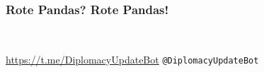 \documentclass{beamer}
\begin{document}
\begin{frame}[fragile]
    \frametitle{Rote Pandas? Rote Pandas!}

    \hfill
    \hfill
    \hfill
    \\[.0133333\linewidth-.1ex]
    \hfill
    \hfill
    \hfill

    \url{https://t.me/DiplomacyUpdateBot} \hfill \texttt{@DiplomacyUpdateBot}
\end{frame}
\end{document}
